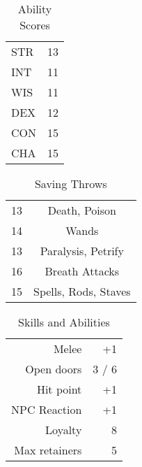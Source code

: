 \documentclass[a4paper]{article}
\begin{document}
\begin{multicols}{2}
\begin{table}[H]
  \begin{center}
    \caption*{Ability Scores}
    \begin{tabular}{l|r} %
      STR & 13\\
      INT & 11\\
      WIS & 11\\
      DEX & 12\\
      CON & 15\\
      CHA & 15\\
    \end{tabular}
  \end{center}
\end{table}
\begin{table}[H]
  \begin{center}
    \caption*{Saving Throws}
    \begin{tabular}{l|c} %
      13 & Death, Poison\\
      14 & Wands\\
      13 & Paralysis, Petrify\\
      16 & Breath Attacks\\
      15 & Spells, Rods, Staves\\
    \end{tabular}
  \end{center}
\end{table}
\begin{table}[H]
  \begin{center}
    \caption*{Skills and Abilities}
    \begin{tabular}{r|r} %
      Melee & +1\\
      Open doors & 3 / 6\\
      Hit point & +1\\
      NPC Reaction & +1\\
      Loyalty & 8\\
      Max retainers & 5\\
    \end{tabular}
  \end{center}
\end{table}
\begin{table}[H]
  \begin{center}

\end{center}
\end{table}
\end{multicols}
\end{document}
